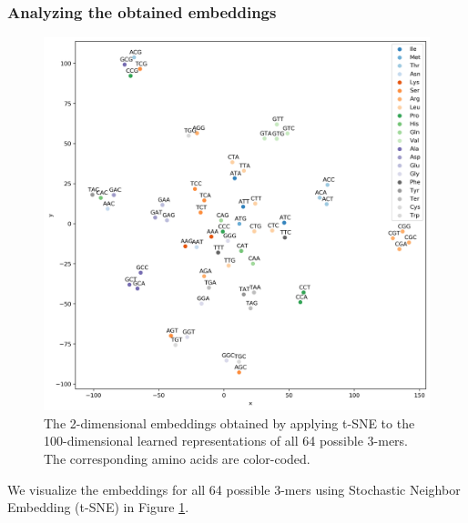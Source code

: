 \subsubsection{Analyzing the obtained embeddings}


\begin{figure}
	\includegraphics[width=1\textwidth]{../visualizations/ch4-methods/tsne_d2v_embeddings.png} 	
	\caption{
		The 2-dimensional embeddings obtained by applying t-SNE to the 100-dimensional learned representations of all 64 possible 3-mers. The corresponding amino acids are color-coded. 
	}
	\label{fig:tsne}
\end{figure}

We visualize the embeddings for all 64 possible 3-mers using Stochastic Neighbor Embedding (t-SNE) \cite{tsne} in Figure \ref{fig:tsne}.

